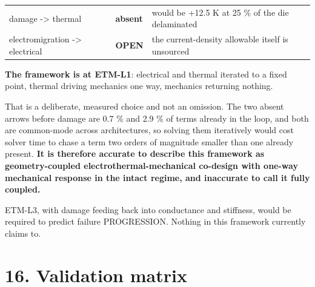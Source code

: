 \documentclass[10pt,]{article}
\begin{document}
\begin{longtable}[]{@{}lll@{}}
\begin{minipage}[t]{0.30\columnwidth}
damage -\textgreater{} thermal\strut
\end{minipage} & \begin{minipage}[t]{0.30\columnwidth}\raggedright
\textbf{absent}\strut
\end{minipage} & \begin{minipage}[t]{0.30\columnwidth}\raggedright
would be +12.5 K at 25 \% of the die delaminated\strut
\end{minipage}\tabularnewline
\begin{minipage}[t]{0.30\columnwidth}\raggedright
electromigration -\textgreater{} electrical\strut
\end{minipage} & \begin{minipage}[t]{0.30\columnwidth}\raggedright
\textbf{OPEN}\strut
\end{minipage} & \begin{minipage}[t]{0.30\columnwidth}\raggedright
the current-density allowable itself is unsourced\strut
\end{minipage}\tabularnewline
\bottomrule
\end{longtable}

\textbf{The framework is at ETM-L1}: electrical and thermal iterated to
a fixed point, thermal driving mechanics one way, mechanics returning
nothing.

That is a deliberate, measured choice and not an omission. The two
absent arrows before damage are 0.7 \% and 2.9 \% of terms already in
the loop, and both are common-mode across architectures, so solving them
iteratively would cost solver time to chase a term two orders of
magnitude smaller than one already present. \textbf{It is therefore
accurate to describe this framework as geometry-coupled
electrothermal-mechanical co-design with one-way mechanical response in
the intact regime, and inaccurate to call it fully coupled.}

ETM-L3, with damage feeding back into conductance and stiffness, would
be required to predict failure PROGRESSION. Nothing in this framework
currently claims to.

\newpage

\hypertarget{validation-matrix}{%
\section{16. Validation matrix}\label{validation-matrix}}
\end{document}
